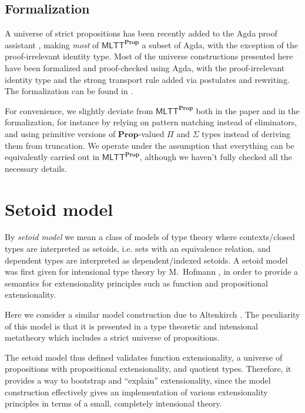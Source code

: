 \documentclass{easychair}
\newcommand{\mlttp}{\textsf{MLTT}^{\mProp}}
\newcommand{\mProp}{\mathbf{Prop}}
\begin{document}
\subsection{Formalization}

A universe of strict propositions has been recently added to the Agda proof
assistant \cite{agda-prop}, making \emph{most} of $\mlttp$ a subset of Agda,
with the exception of the proof-irrelevant identity type. Most of the universe
constructions presented here have been formalized and proof-checked using Agda,
with the proof-irrelevant identity type and the strong transport rule added via
postulates and rewriting. The formalization can be found in \cite{agda-code}.

For convenience, we slightly deviate from $\mlttp$ both in the paper and in the
formalization, for instance by relying on pattern matching instead of
eliminators, and using primitive versions of $\mProp$-valued $\Pi$ and $\Sigma$
types instead of deriving them from truncation. We operate under the assumption
that everything can be equivalently carried out in $\mlttp$, although we haven't
fully checked all the necessary details.

\section{Setoid model}\label{sec:setoid-model}

By \emph{setoid model} we mean a class of models of type theory where
contexts/closed types are interpreted as setoids, i.e. sets with an equivalence
relation, and dependent types are interpreted as dependent/indexed setoids.
%
A setoid model was first given for intensional type theory by M.\ Hofmann
\cite{hofmann}, in order to provide a semantics for extensionality principles such
as function and propositional extensionality.

Here we consider a similar model construction due to Altenkirch
\cite{setoid99}. The peculiarity of this model is that it is presented in a type
theoretic and intensional metatheory which includes a strict universe of
propositions.

The setoid model thus defined validates function extensionality, a universe of
propositions with propositional extensionality, and quotient types. Therefore,
it provides a way to bootstrap and ``explain'' extensionality, since the model
construction effectively gives an implementation of various extensionality
principles in terms of a small, completely intensional theory.
\end{document}
